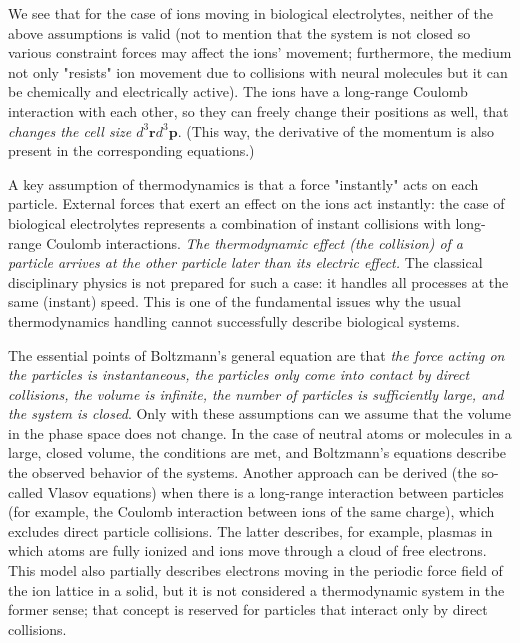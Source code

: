 We see that for the case of ions moving in biological electrolytes, neither of the above assumptions is valid (not to mention that the system is not closed so various constraint forces may affect the ions' movement; furthermore, the medium not only "resists" ion movement due to collisions with neural molecules  but it can be chemically and electrically active). 
The ions have a long-range Coulomb interaction with each other,
so they can freely change their positions as well,
that \textit{changes the cell size $d^3\mathbf{r}d^3\mathbf{p}$}.
(This way, the derivative of the momentum is also present
in the corresponding equations.)


A key assumption of thermodynamics is that a force "instantly" acts on each particle.
External forces that exert an effect on the ions act instantly:
the case of biological electrolytes represents a combination of instant collisions
with long-range Coulomb interactions.
\textit{The thermodynamic effect (the collision) of a particle arrives at the other particle later than its electric effect.}
The classical disciplinary physics is not prepared for such a case:
it handles all processes at the same (instant) speed. This is
one of the fundamental issues why the usual thermodynamics handling
cannot successfully describe biological systems.


The essential points of Boltzmann's general equation are that \textit{the force acting on the particles is instantaneous, the particles only come into contact by direct collisions, the volume is infinite, the number of particles is sufficiently large, and the system is closed}.
Only with these assumptions can we assume that the volume in the phase space does not change. In the case of neutral atoms or molecules in a large, closed volume, the conditions are met, and Boltzmann's equations describe the observed behavior of the systems.
Another approach can be derived (the so-called Vlasov equations) when there is
a long-range interaction between particles (for example, the Coulomb interaction
between ions of the same charge), which excludes direct particle collisions.
The latter describes, for example, plasmas in which atoms are fully ionized and ions move through a cloud of free electrons. This model also partially describes electrons moving in the periodic force field of the ion lattice in a solid, but it is not considered a thermodynamic system in the former sense; that concept is reserved for particles that interact only by direct collisions. 


